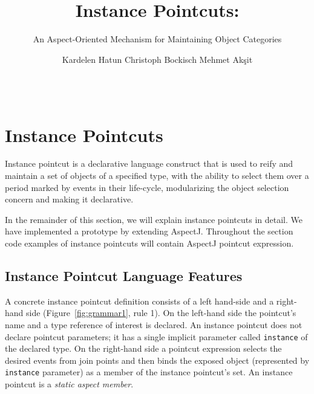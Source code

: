 \documentclass{acm_proc_article-sp}
\begin{document}
\title{Instance Pointcuts:}
\subtitle{An Aspect-Oriented Mechanism for Maintaining Object Categories}

\author{
\alignauthor
Kardelen Hatun \hspace{2cm} Christoph Bockisch \hspace{2cm} Mehmet Ak\c{s}it\\
\\
\\
}




\section{Instance Pointcuts}
\label{sect:ip}
Instance pointcut is a declarative language construct that is used to reify and maintain a set of objects of a specified type, with the ability to select them over a period marked by events in their life-cycle, modularizing the object selection concern and making it declarative. 
 
In the remainder of this section, we will explain instance pointcuts in detail. We have implemented a prototype by extending AspectJ. Throughout the section code examples of instance pointcuts will contain AspectJ pointcut expression.


\subsection{Instance Pointcut Language Features}
\label{sec:features}

A concrete instance pointcut definition consists of a left hand-side and a right-hand side (Figure~\ref{fig:grammar1}, rule 1). 
On the left-hand side the pointcut's name and a type reference of interest is declared. 
An instance pointcut does not declare pointcut parameters; it has a single implicit parameter called \lstinline{instance} of the declared type. 
On the right-hand side a pointcut expression selects the desired events from join points and then binds the exposed object (represented by \lstinline{instance} parameter) as a member of the instance pointcut's set. 
An instance pointcut is a \emph{static aspect member}. %
\end{document}
